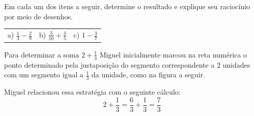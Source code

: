 \begin{atividade}{}

Em cada um dos itens a seguir, determine o resultado e explique seu raciocínio por meio de desenhos.

\begin{center}
  \begin{tabular}{m{}m{}m{}}
     a) $\frac{1}{3} - \frac{2}{9}$  &   b) $\frac{3}{10} + \frac{4}{5}$  &   c) $1 - \frac{3}{7}$
  \end{tabular}
\end{center}
\end{atividade}

\begin{atividade}{}
	Para determinar a soma $2 + \frac{1}{3}$ Miguel inicialmente marcou na reta numérica o ponto determinado pela justaposição do segmento correspondente a $2$ unidades com um segmento igual a $\frac{1}{3}$ da unidade, como na figura a seguir.

Miguel relacionou essa estratégia com o seguinte cálculo:
\[ 2 + \frac{1}{3} =  \frac{6}{3} + \frac{1}{3} = \frac{7}{3}\]

%


\begin{center}
\end{center}
\end{atividade}
